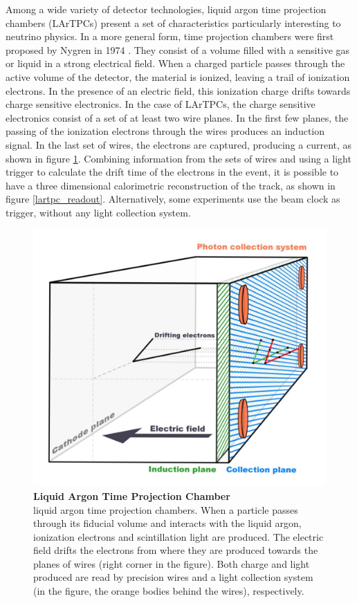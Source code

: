 Among a wide variety of detector technologies, liquid argon time projection chambers (LArTPCs) present a set of characteristics particularly interesting to neutrino physics. 
In a more general form, time projection chambers were first proposed by Nygren in 1974 \cite{Nygren}. They consist of a volume filled with a sensitive gas or liquid in a strong electrical field. When a charged particle passes through the active volume of the detector, the material is ionized, leaving a trail of ionization electrons. In the presence of an electric field, this ionization charge drifts towards charge sensitive electronics.
In the case of LArTPCs, the charge sensitive electronics consist of a set of at least two wire planes. In the first few planes, the passing of the ionization electrons through the wires produces an induction signal. In the last set of wires, the electrons are captured, producing a current, as shown in figure \ref{lartpc}. Combining information from the sets of wires and using a light trigger to calculate the drift time of the electrons in the event, it is possible to have a three dimensional calorimetric reconstruction of the track, as shown in figure \ref{lartpc_readout}. Alternatively, some experiments use the beam clock as trigger, without any light collection system. 

\begin{figure}[h!]
	\begin{center}
		\includegraphics[scale=0.1]{Figures/LARTPC.jpg}
		\caption[LArTPC]{ {\textbf{Liquid Argon Time Projection Chamber}} \\ liquid argon time projection chambers. When a particle passes through its fiducial volume and interacts with the liquid argon, ionization electrons and scintillation light are produced. The electric field drifts the electrons from where they are produced towards the planes of wires (right corner in the figure). Both charge and light produced are read by precision wires and a light collection system (in the figure, the orange bodies behind the wires), respectively.}
		\label{lartpc}	
	\end{center}
\end{figure}


